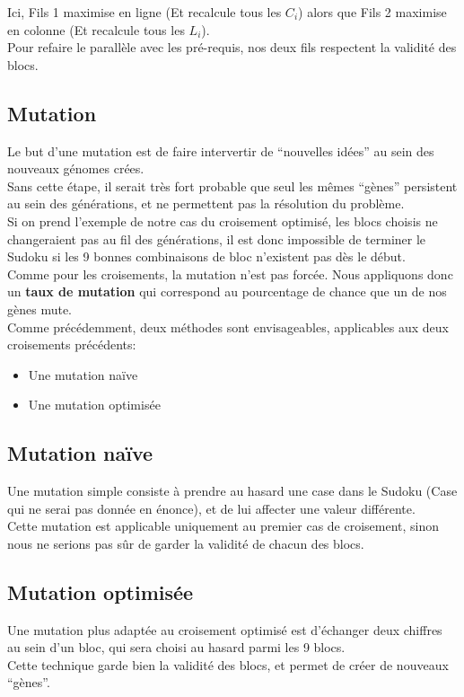                     Ici, Fils 1 maximise en ligne (Et recalcule tous les $C_i$) alors que Fils 2 maximise en colonne (Et recalcule tous les $L_i$).\\

                    Pour refaire le parallèle avec les pré-requis, nos deux fils respectent la validité des blocs.
        \subsection{Mutation}
            Le but d'une mutation est de faire intervertir de ``nouvelles idées'' au sein des nouveaux génomes crées.\\
            Sans cette étape, il serait très fort probable que seul les mêmes ``gènes'' persistent au sein des générations, et ne permettent pas la résolution du problème.\\

            Si on prend l'exemple de notre cas du croisement optimisé, les blocs choisis ne changeraient pas au fil des générations, il est donc impossible de terminer le Sudoku si les 9 bonnes combinaisons de bloc n'existent pas dès le début.\\

            Comme pour les croisements, la mutation n'est pas forcée. Nous appliquons donc un \textbf{taux de mutation} qui correspond au pourcentage de chance que un de nos gènes mute.\\

            Comme précédemment, deux méthodes sont envisageables, applicables aux deux croisements précédents:
            \begin{itemize}
                \item Une mutation naïve
                \item Une mutation optimisée
            \end{itemize}
            \subsection{Mutation naïve}
                Une mutation simple consiste à prendre au hasard une case dans le Sudoku (Case qui ne serai pas donnée en énonce), et de lui affecter une valeur différente.\\
                Cette mutation est applicable uniquement au premier cas de croisement, sinon nous ne serions pas sûr de garder la validité de chacun des blocs.
            \subsection{Mutation optimisée}
                Une mutation plus adaptée au croisement optimisé est d'échanger deux chiffres au sein d'un bloc, qui sera choisi au hasard parmi les 9 blocs.\\
                Cette technique garde bien la validité des blocs, et permet de créer de nouveaux ``gènes''.\\

